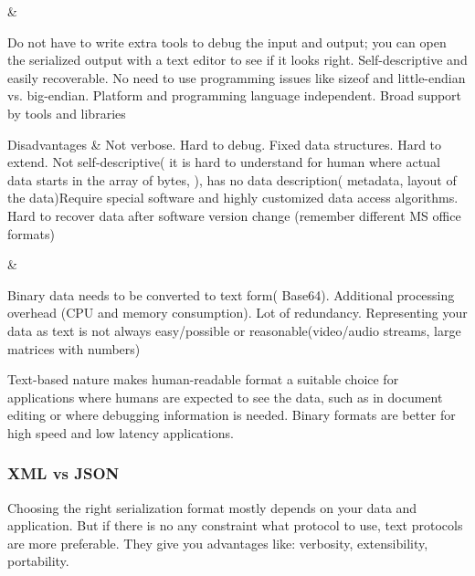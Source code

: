 \begin{longtabu}
		
		&
		
		Do not have to write extra tools to debug the input and output; you can open
		the serialized output with a text editor to see if it looks right. \newline
		Self-descriptive and easily recoverable. \newline
		No need to use programming issues like sizeof and little-endian vs.
		big-endian. \newline
		Platform and programming language independent. \newline
		Broad support by tools and libraries \newline
		
		
		
		
		\tabularnewline
		\hline
		Disadvantages &
		Not verbose. Hard to debug. \newline
		Fixed data structures. Hard to extend. \newline
		Not self-descriptive( it is hard to understand for human where actual data
		starts in the array of bytes, ), has no data description( metadata, layout
		of the data)\newline Require special software and  highly customized data
		access algorithms.
		Hard to recover data after software version change (remember different MS
		office formats)
				
		&
		
		Binary data needs to be converted to text form( Base64). \newline
		Additional processing overhead (CPU and memory consumption). \newline
		Lot of redundancy.
		Representing your data as text is not always easy/possible or
		reasonable(video/audio streams, large matrices with numbers)
				
				
		\tabularnewline
		\hline

\end{longtabu}

Text-based nature makes human-readable format a suitable choice
for applications where humans are expected to see the data,
such as in document editing or where debugging information
is needed. Binary formats are better for high speed and low latency
applications.

\subsubsection{XML vs JSON}
\label{sec:xml_vs_json}
Choosing the right serialization format mostly depends on your data and
application. But if there is no any constraint what protocol to use, text
protocols are more preferable. They give you advantages like: verbosity,
extensibility, portability.

